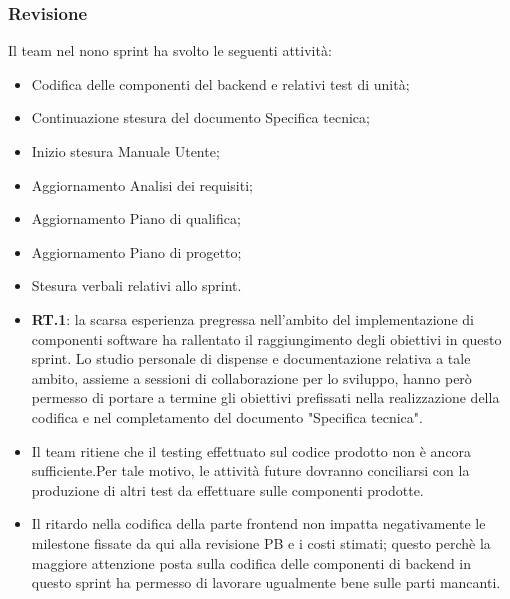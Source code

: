 \documentclass[10pt, a4paper]{article}
\begin{document}
\subsubsection{Revisione}
Il team nel nono sprint ha svolto le seguenti attività:
\begin{itemize}
    \item Codifica delle componenti del backend e relativi test di unità;
    \item Continuazione stesura del documento Specifica tecnica;
    \item Inizio stesura Manuale Utente;
    \item Aggiornamento Analisi dei requisiti;
    \item Aggiornamento Piano di qualifica;
    \item Aggiornamento Piano di progetto;
    \item Stesura verbali relativi allo sprint.
\end{itemize}
\begin{itemize}
    \item \textbf{RT.1}: la scarsa esperienza pregressa nell'ambito del implementazione di componenti software ha rallentato il raggiungimento degli obiettivi in questo sprint. Lo studio personale di dispense e documentazione relativa a tale ambito, assieme a sessioni di collaborazione per lo sviluppo, hanno però permesso di portare a termine gli obiettivi prefissati nella realizzazione della codifica e nel completamento del documento "Specifica tecnica".\end{itemize}
\begin{itemize}
    \item Il team ritiene che il testing effettuato sul codice prodotto non è ancora sufficiente.Per tale motivo, le attività future dovranno conciliarsi con la produzione di altri test da effettuare sulle componenti prodotte.
\end{itemize}
\begin{itemize}
    \item Il ritardo nella codifica della parte frontend non impatta negativamente le milestone fissate da qui alla revisione PB e i costi stimati; questo perchè la maggiore attenzione posta sulla codifica delle componenti di backend in questo sprint ha permesso di lavorare ugualmente bene sulle parti mancanti.
\end{itemize}
\end{document}
